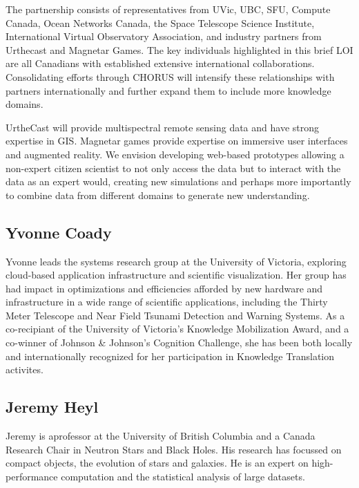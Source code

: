 

The partnership consists of representatives from UVic, UBC, SFU,
Compute Canada, Ocean Networks Canada, the Space Telescope Science
Institute, International Virtual Observatory Association, and industry
partners from Urthecast and Magnetar Games.  The key individuals
highlighted in this brief LOI are all Canadians with established
extensive international collaborations.  Consolidating efforts through
CHORUS will intensify these relationships with partners
internationally and further expand them to include more knowledge
domains.

UrtheCast will provide multispectral remote sensing data and have
strong expertise in GIS.  Magnetar games provide expertise on
immersive user interfaces and augmented reality.  We envision
developing web-based prototypes allowing a non-expert citizen
scientist to not only access the data but to interact with the data as
an expert would, creating new simulations and perhaps more importantly
to combine data from different domains to generate new understanding.

\subsection*{Yvonne Coady} 

Yvonne leads the systems research group at the University of Victoria,
exploring cloud-based application infrastructure and scientific
visualization.  Her group has had impact in optimizations and
efficiencies afforded by new hardware and infrastructure in a wide
range of scientific applications, including the Thirty Meter Telescope
and Near Field Tsunami Detection and Warning Systems.  As a
co-recipiant of the University of Victoria's Knowledge Mobilization
Award, and a co-winner of Johnson \& Johnson's Cognition Challenge, she
has been both locally and internationally recognized for her
participation in Knowledge Translation activites.


\subsection*{Jeremy Heyl}
Jeremy is aprofessor at the University of British Columbia and a
Canada Research Chair in Neutron Stars and Black Holes.  His research
has focussed on compact objects, the evolution of stars and galaxies.
He is an expert on high-performance computation and the statistical
analysis of large datasets.  

